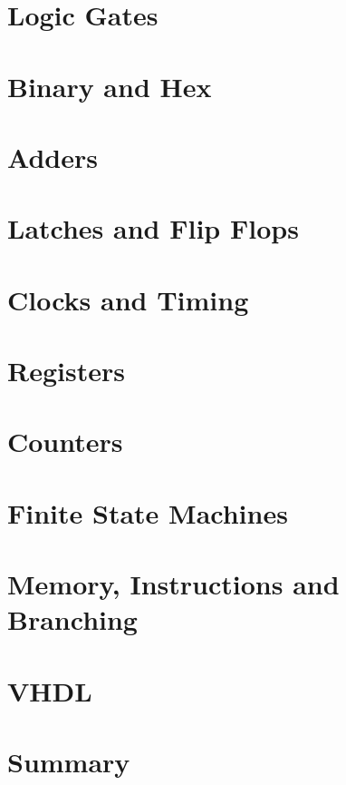 \documentclass[12pt, letterpaper]{memoir}
\begin{document}
\part{Logic Gates}

\part{Binary and Hex}

\part{Adders}

\part{Latches and Flip Flops}

\part{Clocks and Timing}

\part{Registers}

\part{Counters}

\part{Finite State Machines}

\part{Memory, Instructions and Branching}

\part{VHDL}


\part{Summary}
\end{document}
